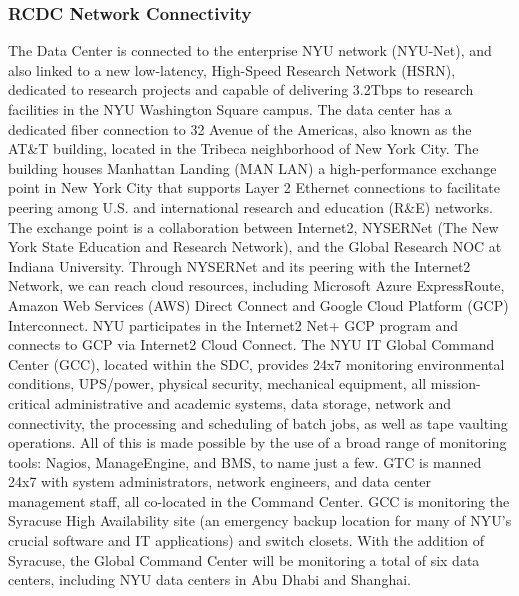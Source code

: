 \subsubsection*{RCDC Network Connectivity}

The Data Center is connected to the enterprise NYU network (NYU-Net), and also  linked to a new low-latency, High-Speed Research Network (HSRN), dedicated to research projects and capable of delivering 3.2Tbps to research facilities in the NYU Washington Square campus.  The data center has a dedicated fiber connection to 32 Avenue of the Americas, also known as the AT\&T building, located in the Tribeca neighborhood of New York City. The building houses Manhattan Landing (MAN LAN) a high-performance exchange point in New York City that supports Layer 2 Ethernet connections to facilitate peering among U.S. and international research and education (R\&E) networks. The exchange point is a collaboration between Internet2, NYSERNet (The New York State Education and Research Network), and the Global Research NOC at Indiana University. Through NYSERNet and its peering with the Internet2 Network, we can reach cloud resources, including Microsoft Azure ExpressRoute, Amazon Web Services (AWS) Direct Connect and Google Cloud Platform (GCP) Interconnect. NYU participates in the Internet2 Net+ GCP program and connects to GCP via Internet2 Cloud Connect. The NYU IT Global Command Center (GCC), located within the SDC, provides 24x7 monitoring environmental conditions, UPS/power, physical security, mechanical equipment, all mission-critical administrative and academic systems, data storage, network and connectivity, the processing and scheduling of batch jobs, as well as tape vaulting operations. All of this is made possible by the use of a broad range of monitoring tools: Nagios, ManageEngine, and BMS, to name just a few. GTC is manned 24x7 with system administrators, network engineers, and data center management staff, all co-located in the Command Center. GCC is monitoring the Syracuse High Availability site (an emergency backup location for many of NYU’s crucial software and IT applications) and switch closets. With the addition of Syracuse, the Global Command Center will be monitoring a total of six data centers, including NYU data centers in Abu Dhabi and Shanghai.

